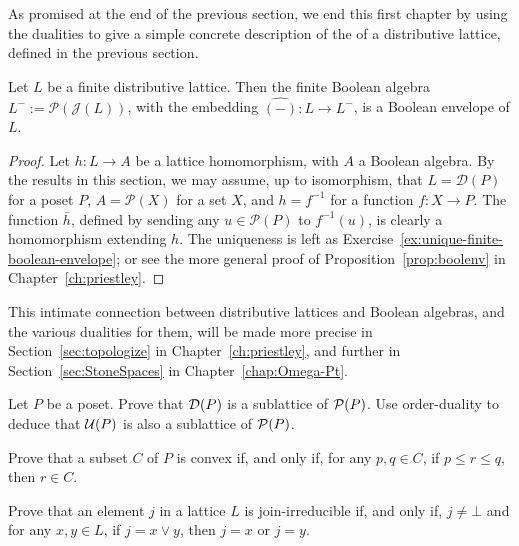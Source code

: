 As promised at the end of the previous section, we end this first chapter by using the dualities to give a simple concrete description of the  of a distributive lattice, defined in the previous section.
\begin{proposition}\label{prop:finite-boolenv}
  Let $L$ be a finite distributive lattice. Then the finite Boolean algebra $L^- := \mathcal{P}(\mathcal{J}(L))$, with the embedding $\widehat{(-)} \colon L \to L^-$, is a Boolean envelope of $L$.
  \end{proposition}
  \begin{proof}
  Let $h \colon L \to A$ be a lattice homomorphism, with $A$ a Boolean algebra. By the results in this section, we may assume, up to isomorphism, that $L = \mathcal{D}(P)$ for a poset $P$, $A = \mathcal{P}(X)$ for a set $X$, and $h = f^{-1}$ for a function $f \colon X \to P$. The function $\bar{h}$, defined by sending any $u \in \mathcal{P}(P)$ to $f^{-1}(u)$, is clearly a homomorphism extending $h$. The uniqueness is left as Exercise~\ref{ex:unique-finite-boolean-envelope}; or see the more general proof of Proposition~\ref{prop:boolenv} in Chapter~\ref{ch:priestley}.
  \end{proof}


This intimate connection between distributive lattices and Boolean algebras, and the various dualities for them, will be made more precise in Section~\ref{sec:topologize} in Chapter~\ref{ch:priestley}, and further in Section~\ref{sec:StoneSpaces} in Chapter~\ref{chap:Omega-Pt}.

\exercises
\begin{exercise}\label{exe:updownsublat}
Let $P$ be a poset. Prove that $\mathcal{D}(P)$ is a sublattice of $\mathcal{P}(P)$. Use order-duality to deduce that $\mathcal{U}(P)$ is also a sublattice of $\mathcal{P}(P)$.
\end{exercise}

\begin{exercise}\label{ex:convex}
Prove that a subset $C$ of $P$ is convex if, and only if, for any $p, q \in C$, if $p \leq r \leq q$, then $r \in C$.
\end{exercise}

\begin{exercise}\label{exe:joinirralt}
Prove that an element $j$ in a lattice $L$ is join-irreducible if, and only if, $j \neq \bot$ and for any $x,y \in L$, if $j = x \vee y$, then $j = x$ or $j = y$.
\end{exercise}


